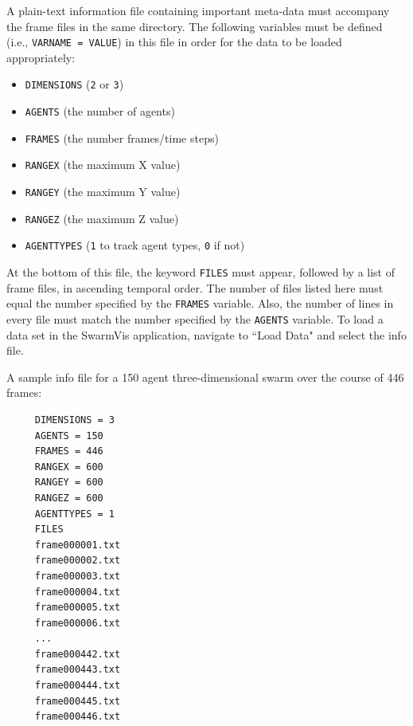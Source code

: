 \documentclass{article}
\begin{document}
A plain-text information file containing important meta-data must accompany the frame files in the same directory.
The following variables must be defined (i.e., \texttt{VARNAME = VALUE}) in this file in order for the data to be loaded appropriately:
\begin{itemize}
\item \texttt{DIMENSIONS} (\texttt{2} or \texttt{3})
\item \texttt{AGENTS} (the number of agents)
\item \texttt{FRAMES} (the number frames/time steps)
\item \texttt{RANGEX} (the maximum X value)
\item \texttt{RANGEY} (the maximum Y value)
\item \texttt{RANGEZ} (the maximum Z value)
\item \texttt{AGENTTYPES} (\texttt{1} to track agent types, \texttt{0} if not)
\end{itemize}
At the bottom of this file, the keyword \texttt{FILES} must appear, followed by a list of frame files, in ascending
temporal order.
The number of files listed here must equal the number specified by the \texttt{FRAMES} variable.
Also, the number of lines in every file must match the number specified by the \texttt{AGENTS} variable.
To load a data set in the SwarmVis application, navigate to ``Load Data" and select the info file.

A sample info file for a 150 agent three-dimensional swarm over the course of 446 frames:


\begin{verbatim}
     DIMENSIONS = 3
     AGENTS = 150
     FRAMES = 446
     RANGEX = 600
     RANGEY = 600
     RANGEZ = 600
     AGENTTYPES = 1
     FILES
     frame000001.txt
     frame000002.txt
     frame000003.txt
     frame000004.txt
     frame000005.txt
     frame000006.txt
     ...
     frame000442.txt
     frame000443.txt
     frame000444.txt
     frame000445.txt
     frame000446.txt
\end{verbatim}



%

%
\end{document}
